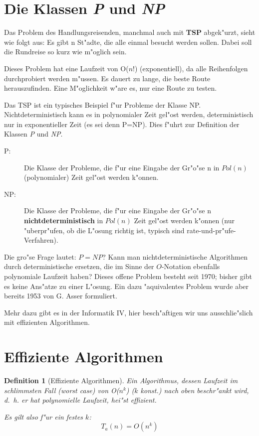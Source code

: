 \documentclass[draft,12pt]{scrreprt}
\theoremstyle{break}
\newtheorem{definition}{Definition}
\begin{document}
\section{Die Klassen \textit{P} und \textit{NP}}
Das Problem des Handlungsreisenden, manchmal auch mit \textbf{TSP} abgek"urzt, sieht wie folgt aus:
Es gibt n St"adte, die alle einmal besucht werden sollen. Dabei soll die
Rundreise so kurz wie m"oglich sein.

Dieses Problem hat eine Laufzeit von O($n!$) (exponentiell), da alle
Reihenfolgen durchprobiert werden m"ussen.  Es dauert zu lange, die beste
Route herauszufinden. Eine M"oglichkeit w"are es, nur eine Route zu
testen.

Das TSP ist ein typisches Beispiel f"ur Probleme der Klasse NP. 
Nichtdeterministisch kann es in polynomialer Zeit  gel"ost werden, 
deterministisch nur in exponentieller Zeit (es sei denn P=NP). Dies f"uhrt zur Definition der Klassen \textit {P} und \textit {NP}.

\begin{description}
 \item[P:] Die Klasse der Probleme, die f"ur eine Eingabe der Gr"o"se n in
  $Pol(n)$ (polynomialer) Zeit gel"ost werden k"onnen.
 \item[NP:] Die Klasse der Probleme, die f"ur eine Eingabe der Gr"o"se n
  \textbf{nichtdeterministisch} in $Pol(n)$ Zeit gel"ost werden k"onnen 
  (nur "uberpr"ufen, ob die L"osung richtig ist, typisch sind
  rate-und-pr"ufe-Verfahren).
\end{description}

Die gro"se Frage lautet: $P=NP$? Kann man nichtdeterministische Algorithmen durch deterministische ersetzen,
die im Sinne der $O$-Notation ebenfalls polynomiale Laufzeit haben?
Dieses offene Problem besteht seit 1970; bisher gibt es keine Ans"atze zu einer L"osung. Ein
dazu "aquivalentes Problem wurde aber bereits 1953 von G. Asser formuliert.

Mehr dazu gibt es in der Informatik IV, hier besch"aftigen wir uns ausschlie"slich mit effizienten Algorithmen.

\section{Effiziente Algorithmen}

\begin{definition}[Effiziente Algorithmen]
  Ein Algorithmus, dessen Laufzeit im schlimmsten Fall (\emph{worst
  case}) von O($n^k$) ($k$ konst.) nach oben beschr"ankt wird, d.~h. er hat
  \emph{polynomielle Laufzeit}, hei"st effizient.
  
  Es gilt also f"ur ein festes $k$:
  \begin{equation*}
    T_a (n)= O(n^k)     
  \end{equation*}
\end{definition}
\end{document}
